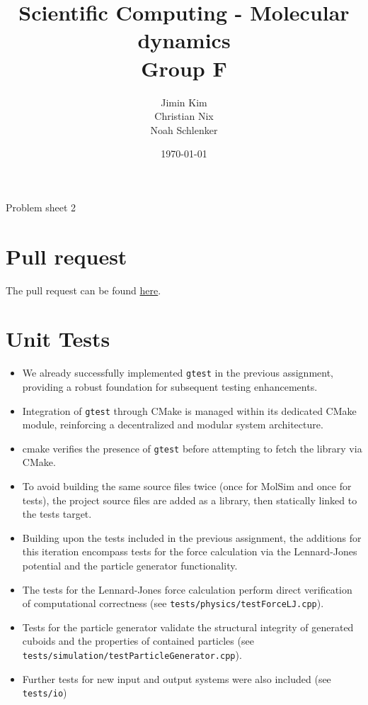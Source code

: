 \documentclass{article}
\title{Scientific Computing - Molecular dynamics \\ Group F}
\author{
    Jimin Kim \\
    Christian Nix \\
    Noah Schlenker
}
\date{\today}
\newcommand{\subtitle}{Problem sheet 2}
\begin{document}
\maketitle

\begin{center}
    \LARGE \subtitle{}
\end{center}

\section{Pull request}
\label{sec:pr}
The pull request can be found \href{https://github.com/noahpy/MolSim-SS24/pull/20}{here}.

\section{Unit Tests}
\label{sec:ut}

\begin{itemize}
    \item We already successfully implemented \verb|gtest| in the previous assignment, providing a robust foundation for subsequent testing enhancements.
    \item Integration of \verb|gtest| through CMake is managed within its dedicated CMake module, reinforcing a decentralized and modular system architecture.
    \item cmake verifies the presence of \verb|gtest| before attempting to fetch the library via CMake.
    \item To avoid building the same source files twice (once for MolSim and once for tests), the project source files are added as a library, then statically linked to the tests target.
    \item Building upon the tests included in the previous assignment, the additions for this iteration encompass tests for the force calculation via the Lennard-Jones potential and the particle generator functionality.
    \item The tests for the Lennard-Jones force calculation perform direct verification of computational correctness (see \texttt{tests/physics/testForceLJ.cpp}).
    \item Tests for the particle generator validate the structural integrity of generated cuboids and the properties of contained particles \newline(see \texttt{tests/simulation/testParticleGenerator.cpp}).
    \item Further tests for new input and output systems were also included (see \texttt{tests/io})
\end{itemize}
\end{document}
